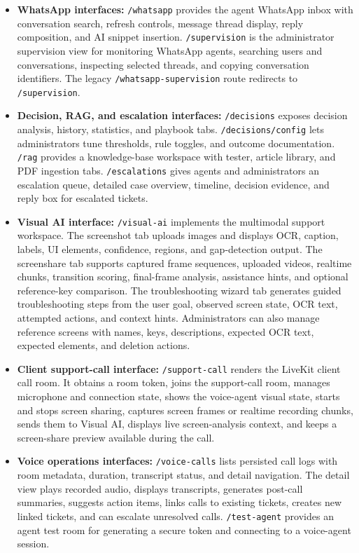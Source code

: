 \begin{itemize}
    \item \textbf{WhatsApp interfaces:} \texttt{/whatsapp} provides the agent WhatsApp inbox with conversation search, refresh controls, message thread display, reply composition, and AI snippet insertion. \texttt{/supervision} is the administrator supervision view for monitoring WhatsApp agents, searching users and conversations, inspecting selected threads, and copying conversation identifiers. The legacy \texttt{/whatsapp-supervision} route redirects to \texttt{/supervision}.
    \item \textbf{Decision, RAG, and escalation interfaces:} \texttt{/decisions} exposes decision analysis, history, statistics, and playbook tabs. \texttt{/decisions/config} lets administrators tune thresholds, rule toggles, and outcome documentation. \texttt{/rag} provides a knowledge-base workspace with tester, article library, and PDF ingestion tabs. \texttt{/escalations} gives agents and administrators an escalation queue, detailed case overview, timeline, decision evidence, and reply box for escalated tickets.
    \item \textbf{Visual AI interface:} \texttt{/visual-ai} implements the multimodal support workspace. The screenshot tab uploads images and displays OCR, caption, labels, UI elements, confidence, regions, and gap-detection output. The screenshare tab supports captured frame sequences, uploaded videos, realtime chunks, transition scoring, final-frame analysis, assistance hints, and optional reference-key comparison. The troubleshooting wizard tab generates guided troubleshooting steps from the user goal, observed screen state, OCR text, attempted actions, and context hints. Administrators can also manage reference screens with names, keys, descriptions, expected OCR text, expected elements, and deletion actions.
    \item \textbf{Client support-call interface:} \texttt{/support-call} renders the LiveKit client call room. It obtains a room token, joins the support-call room, manages microphone and connection state, shows the voice-agent visual state, starts and stops screen sharing, captures screen frames or realtime recording chunks, sends them to Visual AI, displays live screen-analysis context, and keeps a screen-share preview available during the call.
    \item \textbf{Voice operations interfaces:} \texttt{/voice-calls} lists persisted call logs with room metadata, duration, transcript status, and detail navigation. The detail view plays recorded audio, displays transcripts, generates post-call summaries, suggests action items, links calls to existing tickets, creates new linked tickets, and can escalate unresolved calls. \texttt{/test-agent} provides an agent test room for generating a secure token and connecting to a voice-agent session.

\end{itemize}
